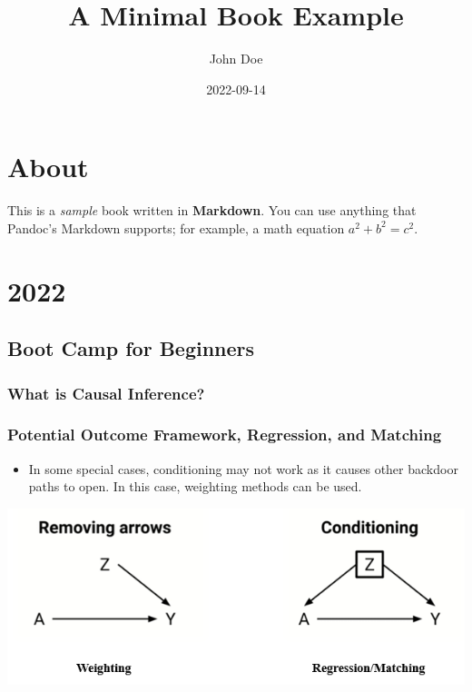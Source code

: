 \documentclass[
]{book}
\title{A Minimal Book Example}
\author{John Doe}
\date{2022-09-14}
\providecommand{\tightlist}{%
  \setlength{\itemsep}{0pt}\setlength{\parskip}{0pt}}
\theoremstyle{definition}
\theoremstyle{definition}
\theoremstyle{definition}
\theoremstyle{definition}
\theoremstyle{remark}
\begin{document}
\maketitle

{
\setcounter{tocdepth}{1}
\tableofcontents
}
\hypertarget{about}{%
\chapter{About}\label{about}}

This is a \emph{sample} book written in \textbf{Markdown}. You can use anything that Pandoc's Markdown supports; for example, a math equation \(a^2 + b^2 = c^2\).

\hypertarget{section}{%
\chapter{2022}\label{section}}

\hypertarget{boot-camp-for-beginners}{%
\section{Boot Camp for Beginners}\label{boot-camp-for-beginners}}

\hypertarget{what-is-causal-inference}{%
\subsection{What is Causal Inference?}\label{what-is-causal-inference}}

\hypertarget{potential-outcome-framework-regression-and-matching}{%
\subsection{Potential Outcome Framework, Regression, and Matching}\label{potential-outcome-framework-regression-and-matching}}

\begin{itemize}
\tightlist
\item
  In some special cases, conditioning may not work as it causes other backdoor paths to open. In this case, weighting methods can be used.
\end{itemize}

\includegraphics{figures/01.png}
\end{document}
